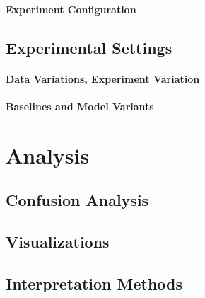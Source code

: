 \documentclass[12pt,a4paper]{article}
\begin{document}
\paragraph{Experiment Configuration}

\subsection{Experimental Settings}
\paragraph{Data Variations, Experiment Variation}
\paragraph{Baselines and Model Variants}

\section{Analysis} 
\subsection{Confusion Analysis}
\subsection{Visualizations}
\subsection{Interpretation Methods}
\end{document}
